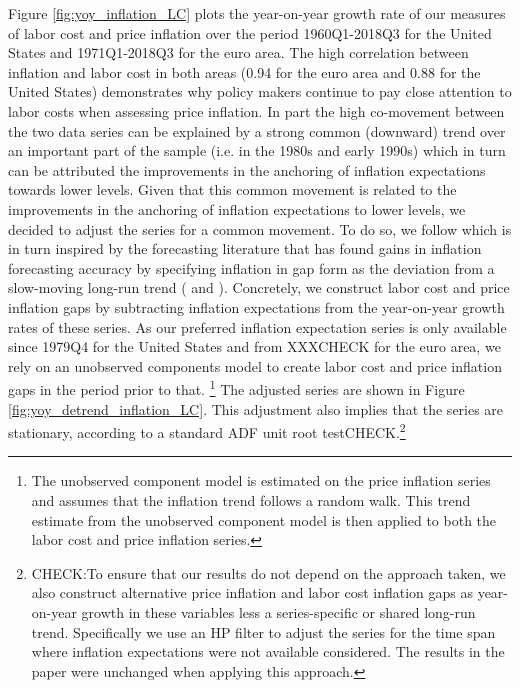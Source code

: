 \documentclass[11pt]{article}
\begin{document}
Figure \ref{fig:yoy_inflation_LC} plots the year-on-year growth rate of our measures of labor cost and price inflation over the period 1960Q1-2018Q3 for the United States and 1971Q1-2018Q3 for the euro area. The high correlation between inflation and labor cost in both areas (0.94 for the euro area and 0.88 for the United States) demonstrates why policy makers continue to pay close attention to labor costs when assessing price inflation. In part the high co-movement between the two data series can be explained by a strong common (downward) trend over an important part of the sample (i.e. in the 1980s and early 1990s) which in turn can be attributed the improvements in the anchoring of inflation expectations towards lower levels. Given that this common movement is related to the improvements in the anchoring of inflation expectations to lower levels, we decided to adjust the series for a common movement. To do so, we follow \cite{Knotek_Zaman_2014} which is in turn inspired by the forecasting literature that has found gains in inflation forecasting accuracy by specifying inflation in gap form as the deviation from a slow-moving long-run trend (\cite{KozickiTinsley2001} and \cite{Zaman13}). Concretely, we construct labor cost and price inflation gaps by subtracting inflation expectations from the year-on-year growth rates of these series. As our preferred inflation expectation series is only available since 1979Q4 for the United States and from XXXCHECK for the euro area, we rely on an unobserved components model to create labor cost and price inflation gaps in the period prior to that. \footnote{The unobserved component model is estimated on the price inflation series and assumes that the inflation trend follows a random walk. This trend estimate from the unobserved component model is then applied to both the labor cost and price inflation series.}
The adjusted series are shown in Figure \ref{fig:yoy_detrend_inflation_LC}. This adjustment also implies that the series are stationary, according to a standard ADF unit root testCHECK.\footnote{CHECK:To ensure that our results do not depend on the approach taken, we also construct alternative price inflation and labor cost inflation gaps as year-on-year growth in these variables less a series-specific or shared long-run trend. Specifically we use an HP filter to adjust the series for the time span where inflation expectations were not available considered. The results in the paper were unchanged when applying this approach.}
\end{document}
